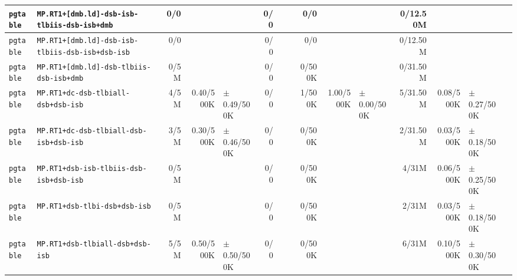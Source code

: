 \begin{tabular}{l l  | r r l | r r l | r r l | r r l l}
        \verb|pgtable| &          \verb|MP.RT1+[dmb.ld]-dsb-isb-tlbiis-dsb-isb+dmb| &            0/0 &                       &                   &            0/0 &                       &  &            0/0 &                       &                   &       0/12.50M &                       &                   & \\ \hline 
        \verb|pgtable| &      \verb|MP.RT1+[dmb.ld]-dsb-isb-tlbiis-dsb-isb+dsb-isb| &            0/0 &                       &                   &            0/0 &                       &  &            0/0 &                       &                   &       0/12.50M &                       &                   & \\ \hline 
        \verb|pgtable| &              \verb|MP.RT1+[dmb.ld]-dsb-tlbiis-dsb-isb+dmb| &           0/5M &                       &                   &            0/0 &                       &  &         0/500K &                       &                   &       0/31.50M &                       &                   & \\ \hline 
        \verb|pgtable| &                   \verb|MP.RT1+dc-dsb-tlbiall-dsb+dsb-isb| &           4/5M &             0.40/500K &   $\pm$ 0.49/500K &            0/0 &                       &  &         1/500K &             1.00/500K &   $\pm$ 0.00/500K &       5/31.50M &             0.08/500K &   $\pm$ 0.27/500K & \\ \hline 
        \verb|pgtable| &               \verb|MP.RT1+dc-dsb-tlbiall-dsb-isb+dsb-isb| &           3/5M &             0.30/500K &   $\pm$ 0.46/500K &            0/0 &                       &  &         0/500K &                       &                   &       2/31.50M &             0.03/500K &   $\pm$ 0.18/500K & \\ \hline 
        \verb|pgtable| &               \verb|MP.RT1+dsb-isb-tlbiis-dsb-isb+dsb-isb| &           0/5M &                       &                   &            0/0 &                       &  &         0/500K &                       &                   &          4/31M &             0.06/500K &   $\pm$ 0.25/500K & \\ \hline 
        \verb|pgtable| &                         \verb|MP.RT1+dsb-tlbi-dsb+dsb-isb| &           0/5M &                       &                   &            0/0 &                       &  &         0/500K &                       &                   &          2/31M &             0.03/500K &   $\pm$ 0.18/500K & \\ \hline 
        \verb|pgtable| &                      \verb|MP.RT1+dsb-tlbiall-dsb+dsb-isb| &           5/5M &             0.50/500K &   $\pm$ 0.50/500K &            0/0 &                       &  &         0/500K &                       &                   &          6/31M &             0.10/500K &   $\pm$ 0.30/500K & \\ \hline 

\end{tabular}
